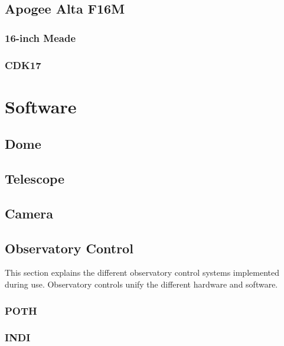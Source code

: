 \subsection{Apogee Alta F16M}
\subsubsection{16-inch Meade}
\subsubsection{CDK17}

\section{Software}
\subsection{Dome}
\subsection{Telescope}
\subsection{Camera}
\subsection{Observatory Control}
This section explains the different observatory control systems implemented during use.
Observatory controls unify the different hardware and software. 
\subsubsection{POTH}
\subsubsection{INDI}
